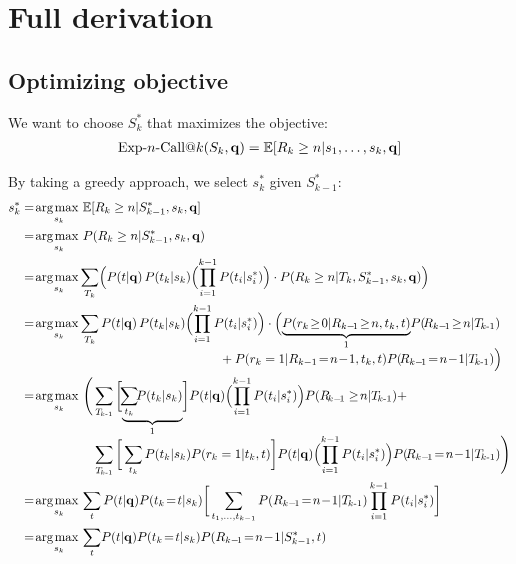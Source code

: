 \section{Full derivation}
\subsection{Optimizing objective}
\label{appendix.ncall}

We want to choose $S_k^*$ that maximizes the objective:
\begin{align*}
  \ExpNCall{n}(S_k,\vec{q})
  = \mathbb{E}[R_k\geq n|s_1,\dots,s_k,\vec{q}]
\end{align*}

\noindent
By taking a greedy approach, we select $s_k^*$ given $S_{k-1}^*$:
\begin{align}
  s_k^* & = \argmax_{s_k} \mathbb{E}[R_k\geq n|S_{k-1}^*,s_k,\vec{q}] \nonumber\\
% 
  & = \argmax_{s_k} P(R_k\geq n|S_{k-1}^*,s_k,\vec{q}) \label{note1}\\
%
  & = \argmax_{s_k} \!\sum_{T_k} \Bigl( P(t|\vec{q}) \,P(t_k|s_k) \Bigl( \prod_{i=1}^{k-1} P(t_i|s_i^*) \Bigr) \cdot P(R_k\geq n|T_k,S_{k-1}^*,s_k,\vec{q}) \Bigr) \label{note2}\\
%
  & = \argmax_{s_k} \!\sum_{T_k} P(t|\vec{q}) \,P(t_k|s_k) \Bigl( \prod_{i=1}^{k-1} P(t_i|s_i^*) \Bigr) \cdot \Bigl( \mbox{$\underbrace{P(r_k\!\geq\!0|R_{k-\!1}\!\geq\!n,t_k,t)}_{1}$} P(\!R_{k-\!1}\!\geq\!n|\TlessK) \nonumber \\[-1.5mm]
  & \hspace{55mm} + P(r_k=1|R_{k-1}\!=\!n\!-\!1,t_k,t) P(\!R_{k-\!1}\!=\!n\!-\!1|\TlessK) \Big) \label{note3}\\
%
  & = \argmax_{s_k} \Bigg( \sum_{\TlessK} \bigg[ \mbox{$\underbrace{ \!\sum_{t_k} \!\!P(t_k|s_k) }_{1}$} \bigg] P(t|\vec{q}) \Bigl( \prod_{i=1}^{k-1} P(t_i|s_i^*) \Bigr) P(R_{\!k-\!1}\geq\!n|\TlessK) + \nonumber \\[-1.5mm]
  & \hspace{20mm} \sum_{\TlessK} \bigg[ \sum_{t_k} P(t_k|s_k) P(r_k=1|t_k,t) \bigg] P(t|\vec{q}) \Bigl( \prod_{i=1}^{k-1} P(t_i|s_i^*) \Bigr) P(\!R_{k-\!1}\!=\!n\!-\!1|\TlessK) \Bigg) \nonumber\\
%
  & = \argmax_{s_k} \sum_{t} P(t|\vec{q}) P(t_k\!=\!t|s_k) \bigg[ \sum_{t_1, \dots, t_{k-1}}  P(R_{k-\!1}\!=\!n\!-\!1|\TlessK) \prod_{i=1}^{k-1} P(t_i|s_i^*) \bigg] \label{note4}\\
%
  & = \argmax_{s_k} \sum_{t} \!P(t|\vec{q}) P(t_k\!=\!t|s_k) P(R_{k-\!1}\!=\!n\!-\!1|S_{k-1}^*, t) \label{eq.ncall-repeat}
\end{align}

